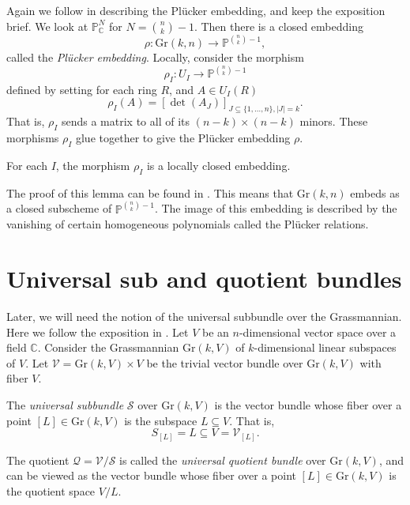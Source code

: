 Again we follow \cite{EO25} in describing the Plücker embedding, and keep the exposition brief. We look at $\mathbb{P}_\mathbb{C}^N$ for $N = \binom{n}{k}-1$. Then there is a closed embedding
\[\rho \colon \mathrm{Gr}(k,n) \rightarrow \mathbb{P}^{\binom{n}{k}-1},\]
called the \emph{Plücker embedding}. Locally, consider the morphism
\[\rho_I \colon U_I \rightarrow \mathbb{P}^{\binom{n}{k}-1}\]
defined by setting for each ring $R$, and $A \in U_I(R)$
\[\rho_I(A) = [\det(A_J)]_{J \subseteq \{1,\ldots,n\}, |J|=k}.\]
That is, $\rho_I$ sends a matrix to all of its $(n-k)\times(n-k)$ minors. These morphisms $\rho_I$ glue together to give the Plücker embedding $\rho$.

\begin{lemma}%
    For each $I$, the morphism $\rho_I$ is a locally closed embedding.
\end{lemma}
The proof of this lemma can be found in \cite[Lemma A.24]{EO25}. This means that $\mathrm{Gr}(k,n)$ embeds as a closed subscheme of $\mathbb{P}^{\binom{n}{k}-1}$. The image of this embedding is described by the vanishing of certain homogeneous polynomials called the Plücker relations. 

\section{Universal sub and quotient bundles}

Later, we will need the notion of the universal subbundle over the Grassmannian. Here we follow the exposition in \cite[Section 3.2.3]{EH16}. Let $V$ be an $n$-dimensional vector space over a field $\mathbb{C}$. Consider the Grassmannian $\mathrm{Gr}(k, V)$ of $k$-dimensional linear subspaces of $V$. Let $\mathcal{V} = \mathrm{Gr}(k, V) \times V$ be the trivial vector bundle over $\mathrm{Gr}(k, V)$ with fiber $V$. 

\begin{definition}
    The \emph{universal subbundle} $\mathcal{S}$ over $\mathrm{Gr}(k, V)$ is the vector bundle whose fiber over a point $[L] \in \mathrm{Gr}(k, V)$ is the subspace $L \subseteq V$. That is, 
    \[S_{[L]} = L \subseteq V = \mathcal{V}_{[L]}.\]
\end{definition}

\begin{definition}
    The quotient $\mathcal{Q} = \mathcal{V} / \mathcal{S}$ is called the \emph{universal quotient bundle} over $\mathrm{Gr}(k, V)$, and can be viewed as the vector bundle whose fiber over a point $[L] \in \mathrm{Gr}(k, V)$ is the quotient space $V/L$.
\end{definition}

